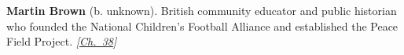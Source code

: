 \textbf{Martin Brown} (b. unknown). British community educator and public historian who founded the National Children's Football Alliance and established the Peace Field Project. \emph{[\hyperref[ch:christmastruce1914]{Ch.~38}]}

